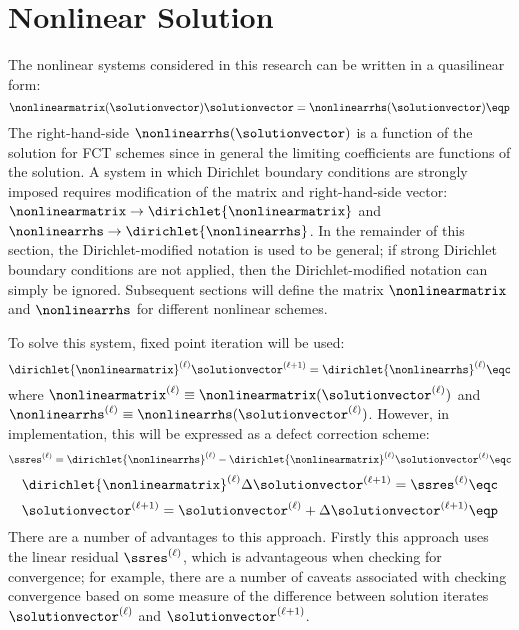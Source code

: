 \section{Nonlinear Solution}
The nonlinear systems considered in this research can be written in a quasilinear
form:
\begin{equation}\label{eq:nonlinear_equation}
  \nonlinearmatrix(\solutionvector)\solutionvector
    = \nonlinearrhs(\solutionvector) \eqp
\end{equation}
The right-hand-side $\nonlinearrhs(\solutionvector)$ is a function of
the solution for FCT schemes since in general the limiting coefficients are
functions of the solution.
A system in which Dirichlet boundary conditions are strongly imposed
requires modification of the matrix and right-hand-side vector:
$\nonlinearmatrix\rightarrow\dirichlet{\nonlinearmatrix}$ and
$\nonlinearrhs\rightarrow\dirichlet{\nonlinearrhs}$. In the remainder of
this section, the Dirichlet-modified notation is used to be general;
if strong Dirichlet boundary conditions are not applied, then the
Dirichlet-modified notation can simply be ignored. Subsequent sections
will define the matrix $\nonlinearmatrix$ and $\nonlinearrhs$ for different
nonlinear schemes.

To solve this system, fixed point iteration will be used:
\begin{equation}
  \dirichlet{\nonlinearmatrix}^{(\ell)}\solutionvector^{(\ell+1)}
    = \dirichlet{\nonlinearrhs}^{(\ell)} \eqc
\end{equation}
where $\nonlinearmatrix^{(\ell)}\equiv\nonlinearmatrix(\solutionvector^{(\ell)})$
and $\nonlinearrhs^{(\ell)}\equiv\nonlinearrhs(\solutionvector^{(\ell)})$.
However, in implementation, this will be expressed as a defect correction scheme:
\begin{equation}
  \ssres^{(\ell)} = \dirichlet{\nonlinearrhs}^{(\ell)}
    - \dirichlet{\nonlinearmatrix}^{(\ell)}\solutionvector^{(\ell)} \eqc
\end{equation}
\begin{equation}
  \dirichlet{\nonlinearmatrix}^{(\ell)}\Delta\solutionvector^{(\ell+1)}
    = \ssres^{(\ell)} \eqc
\end{equation}
\begin{equation}
  \solutionvector^{(\ell+1)} = \solutionvector^{(\ell)}
    + \Delta\solutionvector^{(\ell+1)} \eqp
\end{equation}
There are a number of advantages to this approach. Firstly this approach uses
the linear residual $\ssres^{(\ell)}$, which is advantageous when checking
for convergence; for example, there are a number of caveats associated with
checking convergence based on some measure of the difference between solution
iterates $\solutionvector^{(\ell)}$ and $\solutionvector^{(\ell+1)}$.

